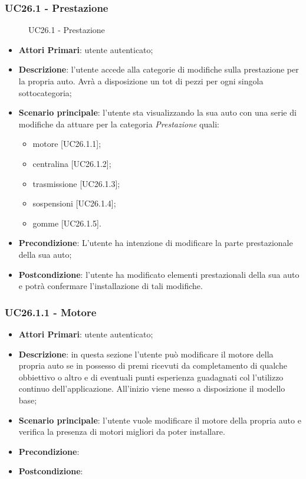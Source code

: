 \subsubsection{UC26.1 - Prestazione}
\begin{figure}[h]
	\centering
	\caption{UC26.1 - Prestazione}
\end{figure}
\begin{itemize}
	\item \textbf{Attori Primari}: utente autenticato;
	\item \textbf{Descrizione}: l'utente accede alla categorie di modifiche sulla prestazione per la propria auto. Avrà a disposizione un tot di pezzi per ogni singola sottocategoria;
	\item \textbf{Scenario principale}: l'utente sta visualizzando la sua auto con una serie di modifiche da attuare per la categoria \textit{Prestazione} quali:
	\begin{itemize}
		\item motore [UC26.1.1];
		\item centralina [UC26.1.2];
		\item trasmissione [UC26.1.3];
		\item sospensioni [UC26.1.4];
		\item gomme [UC26.1.5].
	\end{itemize}
	\item \textbf{Precondizione}: L'utente ha intenzione di modificare la parte prestazionale della sua auto;
	\item \textbf{Postcondizione}: l'utente ha modificato elementi prestazionali della sua auto e potrà confermare l'installazione di tali modifiche.
\end{itemize}
\subsubsection{UC26.1.1 - Motore}
\begin{itemize}
	\item \textbf{Attori Primari}: utente autenticato;
	\item \textbf{Descrizione}: in questa sezione l'utente può modificare il motore della propria auto se in possesso di premi ricevuti da completamento di qualche obbiettivo o altro e di eventuali punti esperienza guadagnati col l'utilizzo continuo dell'applicazione.
	All'inizio viene messo a disposizione il modello base;
	\item \textbf{Scenario principale}: l'utente vuole modificare il motore della propria auto e verifica la presenza di motori migliori da poter installare.
	\item \textbf{Precondizione}: 
	\item \textbf{Postcondizione}:
\end{itemize}
